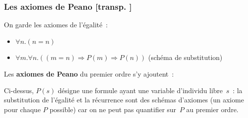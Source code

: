 \documentclass[mathserif,a4paper,aspectratio=169]{beamer}
\newcommand{\itempoint}{\strut\hbox{\color{beamerstructure}\donotcoloroutermaths$\blacktriangleright$}\nobreak\hskip.5em plus.5em\relax}
\newcommand{\donotcoloroutermaths}{\relax}
\renewcommand{\frametitle}[1]{\subsubsection*{#1 {\footnotesize[transp. \insertframenumber]}}}
\newcommand{\myitemmark}{\hbox{$\blacktriangleright$}}
\renewcommand{\itempoint}{\strut\myitemmark\nobreak\hskip.5em plus.5em\relax}
\begin{document}
\begin{frame}
\frametitle{Les axiomes de Peano}

On garde les axiomes de l'égalité :
\begin{itemize}
\item $\forall n.(n=n)$
\item $\forall m.\forall n.((m=n) \Rightarrow P(m) \Rightarrow P(n))$
(schéma de substitution)
\end{itemize}

\medskip

Les \textbf{axiomes de Peano} du premier ordre s'y ajoutent :

\medskip

Ci-dessus, $P(s)$ désigne une formule ayant une variable d'individu
libre $s$ : la substitution de l'égalité et la récurrence sont des
\alert{schémas d'axiomes} (un axiome pour chaque $P$ possible) car on
ne peut pas quantifier sur $P$ au premier ordre.

\end{frame}
%
\end{document}
